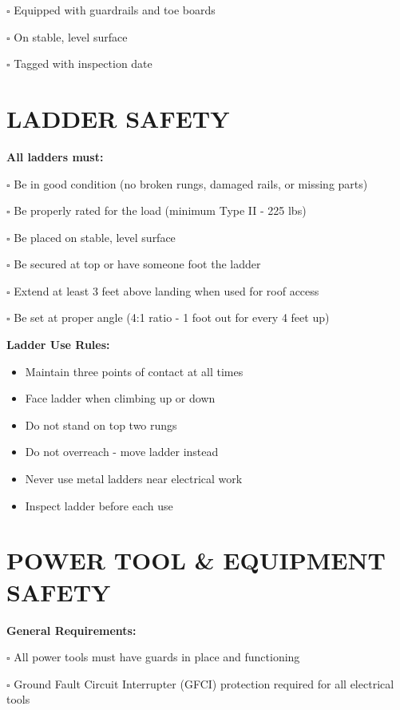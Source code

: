 \documentclass[11pt,letterpaper]{article}
\begin{document}
$\square$ Equipped with guardrails and toe boards

$\square$ On stable, level surface

$\square$ Tagged with inspection date

\vspace{12pt}

\section*{LADDER SAFETY}

\textbf{All ladders must:}

$\square$ Be in good condition (no broken rungs, damaged rails, or missing parts)

$\square$ Be properly rated for the load (minimum Type II - 225 lbs)

$\square$ Be placed on stable, level surface

$\square$ Be secured at top or have someone foot the ladder

$\square$ Extend at least 3 feet above landing when used for roof access

$\square$ Be set at proper angle (4:1 ratio - 1 foot out for every 4 feet up)

\vspace{6pt}

\textbf{Ladder Use Rules:}

\begin{itemize}[leftmargin=0.5in]
\item Maintain three points of contact at all times
\item Face ladder when climbing up or down
\item Do not stand on top two rungs
\item Do not overreach - move ladder instead
\item Never use metal ladders near electrical work
\item Inspect ladder before each use
\end{itemize}

\newpage

\section*{POWER TOOL \& EQUIPMENT SAFETY}

\textbf{General Requirements:}

$\square$ All power tools must have guards in place and functioning

$\square$ Ground Fault Circuit Interrupter (GFCI) protection required for all electrical tools
\end{document}
